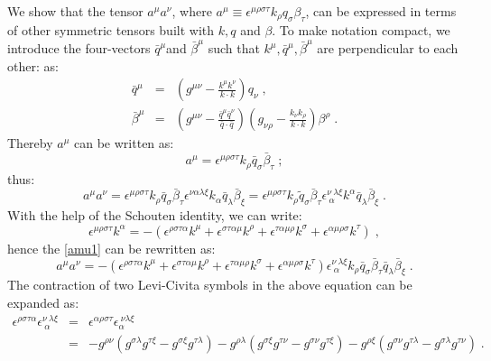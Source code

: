 \documentclass[prd,superscriptaddress,nofootinbib,notitlepage]{revtex4-1}
\newcommand{\be}{\begin{equation}}
\newcommand{\ee}{\end{equation}}
\begin{document}
We show that the tensor $a^{\mu}a^{\nu}$, where $a^{\mu}\equiv\epsilon^{\mu\rho\sigma\tau}k_{\rho}q_{\sigma}\beta_{\tau}$, 
can be expressed in terms of other symmetric tensors built with $k,q$ and $\beta$. To make notation compact, we introduce 
the four-vectors $\bar{q}^{\mu}$and $\bar{\beta}^{\mu}$ such that $k^{\mu},\bar{q}^{\mu},\bar{\beta}^{\mu}$ are perpendicular 
to each other:
as:
%
\begin{eqnarray}\label{qbetabar}
\bar{q}^{\mu} & = & \left(g^{\mu\nu}-\frac{k^{\mu}k^{\nu}}{k\cdot k}\right)q_{\nu}\nonumber\;, \nonumber \\
\bar{\beta}^{\mu} & = & \left(g^{\mu\nu}-\frac{\bar{q}^{\mu}\bar{q}^{\nu}}{\bar{q}\cdot\bar{q}}\right)
\left(g_{\nu\rho}-\frac{k_{\nu}k_{\rho}}{k\cdot k}\right)\beta^{\rho}\;.
\end{eqnarray}
%
Thereby $a^{\mu}$ can be written as:
%
\begin{equation*}
a^{\mu}=\epsilon^{\mu\rho\sigma\tau}k_{\rho}\bar{q}_{\sigma}\bar{\beta}_{\tau}\; ;
\end{equation*}
%
thus:
%
\be\label{amu1}
a^{\mu}a^{\nu} = \epsilon^{\mu\rho\sigma\tau}k_{\rho}\bar{q}_{\sigma}\bar{\beta}_{\tau}
\epsilon^{\nu\alpha\lambda\xi}k_{\alpha}\bar{q}_{\lambda}\bar{\beta}_{\xi} = 
\epsilon^{\mu\rho\sigma\tau}k_{\rho}\tilde{q}_{\sigma}\bar{\beta}_{\tau}
\epsilon_{\ \alpha}^{\nu\ \lambda\xi}k^{\alpha}\bar{q}_{\lambda}\bar{\beta}_{\xi}\;.
\ee
%
With the help of the Schouten identity, we can write:
%
\begin{equation*}
\epsilon^{\mu\rho\sigma\tau}k^{\alpha}=-\left(\epsilon^{\rho\sigma\tau\alpha}k^{\mu}+
\epsilon^{\sigma\tau\alpha\mu}k^{\rho}+
\epsilon^{\tau\alpha\mu\rho}k^{\sigma}+\epsilon^{\alpha\mu\rho\sigma}k^{\tau}\right)\;,
\end{equation*}
%
hence the \eqref{amu1} can be rewritten as:
%
\begin{equation*}
a^{\mu}a^{\nu}=-\left(\epsilon^{\rho\sigma\tau\alpha}k^{\mu}+\epsilon^{\sigma\tau\alpha\mu}k^{\rho}+
\epsilon^{\tau\alpha\mu\rho}k^{\sigma}+\epsilon^{\alpha\mu\rho\sigma}k^{\tau}\right)
\epsilon_{\ \alpha}^{\nu\ \lambda\xi}k_{\rho}\bar{q}_{\sigma}\bar{\beta}_{\tau}\bar{q}_{\lambda}\bar{\beta}_{\xi}\;.
\end{equation*}
%
The contraction of two Levi-Civita symbols in the above equation can be expanded as:
%
\begin{eqnarray*}
\epsilon^{\rho\sigma\tau\alpha}\epsilon_{\ \alpha}^{\nu\ \lambda\xi} & = & 
\epsilon^{\alpha\rho\sigma\tau}\epsilon_{\alpha}^{\ \nu\lambda\xi}\nonumber \\
 & = & -g^{\rho\nu}(g^{\sigma\lambda}g^{\tau\xi}-g^{\sigma\xi}g^{\tau\lambda})
 -g^{\rho\lambda}(g^{\sigma\xi}g^{\tau\nu}-g^{\sigma\nu}g^{\tau\xi}) -g^{\rho\xi}
 (g^{\sigma\nu}g^{\tau\lambda}-g^{\sigma\lambda}g^{\tau\nu})\;.
\end{eqnarray*}
\end{document}
